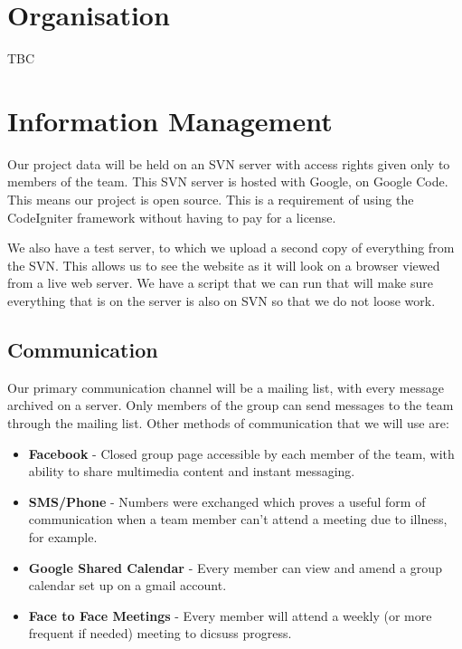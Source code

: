 \documentclass{l3proj}
\begin{document}
\section{Organisation}
TBC

\section{Information Management}

Our project data will be held on an SVN server with access rights given only to members of the team. This SVN server is hosted with Google, on Google Code. This means our project is open source. This is a requirement of using the CodeIgniter framework without having to pay for a license. 

We also have a test server, to which we upload a second copy of everything from the SVN. This allows us to see the website as it will look on a browser viewed from a live web server. We have a script that we can run that will make sure everything that is on the server is also on SVN so that we do not loose work.

\subsection{Communication}
Our primary communication channel will be a mailing list, with every message archived on a server. Only members of the group can send messages to the team through the mailing list. Other methods of communication that we will use are:
\begin{itemize}
\item \textbf{Facebook} - Closed group page accessible by each member of the team, with ability to share multimedia content and instant messaging.
\item \textbf{SMS/Phone} - Numbers were exchanged which proves a useful form of communication when a team member can't attend a meeting due to illness, for example.
\item \textbf{Google Shared Calendar} - Every member can view and amend a group calendar set up on a gmail account.
\item \textbf{Face to Face Meetings} - Every member will attend a weekly (or more frequent if needed) meeting to dicsuss progress.
\end{itemize}
\end{document}

